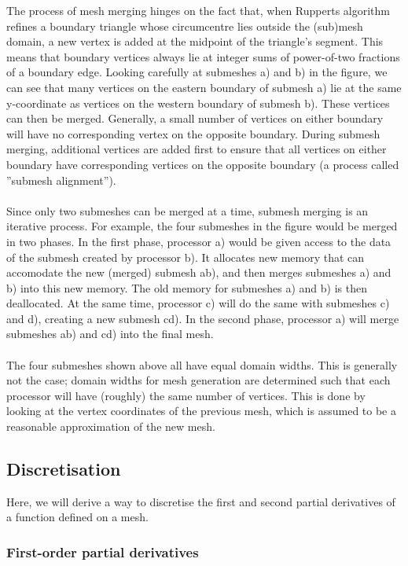 \documentclass{article}
\begin{document}
The process of mesh merging hinges on the fact that, when Rupperts algorithm refines a boundary triangle whose circumcentre lies outside the (sub)mesh domain, a new vertex is added at the midpoint of the triangle's segment. This means that boundary vertices always lie at integer sums of power-of-two fractions of a boundary edge. Looking carefully at submeshes a) and b) in the figure, we can see that many vertices on the eastern boundary of submesh a) lie at the same y-coordinate as vertices on the western boundary of submesh b). These vertices can then be merged. Generally, a small number of vertices on either boundary will have no corresponding vertex on the opposite boundary. During submesh merging, additional vertices are added first to ensure that all vertices on either boundary have corresponding vertices on the opposite boundary (a process called ''submesh alignment'').\\
\\
Since only two submeshes can be merged at a time, submesh merging is an iterative process. For example, the four submeshes in the figure would be merged in two phases. In the first phase, processor a) would be given access to the data of the submesh created by processor b). It allocates new memory that can accomodate the new (merged) submesh ab), and then merges submeshes a) and b) into this new memory. The old memory for submeshes a) and b) is then deallocated. At the same time, processor c) will do the same with submeshes c) and d), creating a new submesh cd). In the second phase, processor a) will merge submeshes ab) and cd) into the final mesh.\\
\\
The four submeshes shown above all have equal domain widths. This is generally not the case; domain widths for mesh generation are determined such that each processor will have (roughly) the same number of vertices. This is done by looking at the vertex coordinates of the previous mesh, which is assumed to be a reasonable approximation of the new mesh.

\subsection{Discretisation}

Here, we will derive a way to discretise the first and second partial derivatives of a function defined on a mesh.

\subsubsection{First-order partial derivatives}
\end{document}
